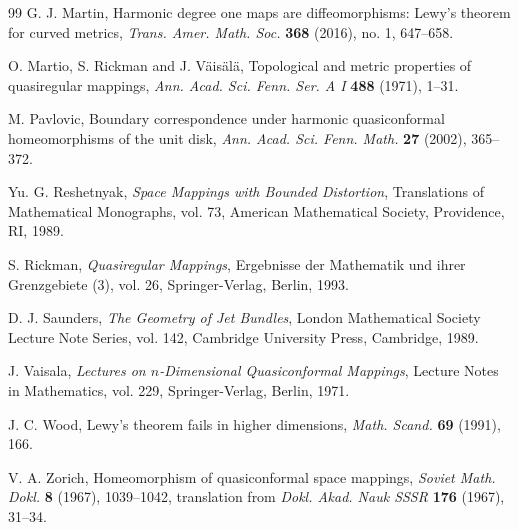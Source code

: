 \documentclass[10pt]{amsart}
\numberwithin{equation}{section}
\theoremstyle{definition}
\begin{document}
\begin{thebibliography}{99}
G. J. Martin,
Harmonic degree one maps are diffeomorphisms: Lewy's theorem for curved
metrics,
\emph{Trans. Amer. Math. Soc.} \textbf{368} (2016), no. 1, 647--658.

O. Martio, S. Rickman and J. V\"ais\"al\"a,
Topological and metric properties of quasiregular mappings,
\emph{Ann. Acad. Sci. Fenn. Ser. A I} \textbf{488} (1971), 1--31.

M. Pavlovic,
Boundary correspondence under harmonic quasiconformal homeomorphisms of the
unit disk,
\emph{Ann. Acad. Sci. Fenn. Math.} \textbf{27} (2002), 365--372.

Yu. G. Reshetnyak,
\emph{Space Mappings with Bounded Distortion},
Translations of Mathematical Monographs, vol. 73, American Mathematical
Society, Providence, RI, 1989.

S. Rickman,
\emph{Quasiregular Mappings},
Ergebnisse der Mathematik und ihrer Grenzgebiete (3), vol. 26,
Springer-Verlag, Berlin, 1993.

D. J. Saunders,
\emph{The Geometry of Jet Bundles},
London Mathematical Society Lecture Note Series, vol. 142, Cambridge
University Press, Cambridge, 1989.

J. Vaisala,
\emph{Lectures on \(n\)-Dimensional Quasiconformal Mappings},
Lecture Notes in Mathematics, vol. 229, Springer-Verlag, Berlin, 1971.

J. C. Wood,
Lewy's theorem fails in higher dimensions,
\emph{Math. Scand.} \textbf{69} (1991), 166.

V. A. Zorich,
Homeomorphism of quasiconformal space mappings,
\emph{Soviet Math. Dokl.} \textbf{8} (1967), 1039--1042, translation from
\emph{Dokl. Akad. Nauk SSSR} \textbf{176} (1967), 31--34.

\end{thebibliography}
\end{document}
